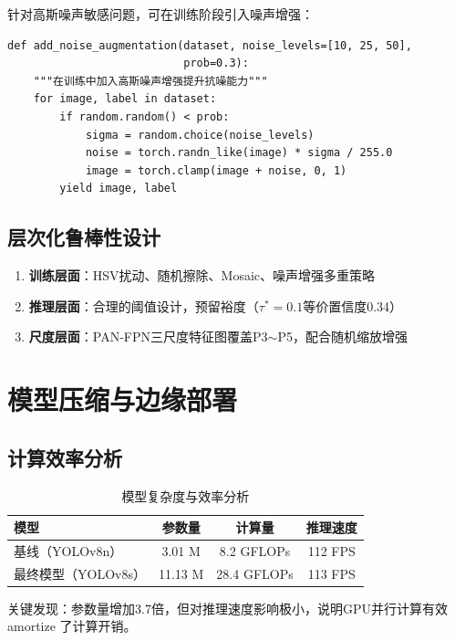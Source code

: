 \documentclass[12pt,a4paper]{ctexart}
\theoremstyle{cumcm}
\begin{document}
针对高斯噪声敏感问题，可在训练阶段引入噪声增强：

\begin{lstlisting}
def add_noise_augmentation(dataset, noise_levels=[10, 25, 50],
                           prob=0.3):
    """在训练中加入高斯噪声增强提升抗噪能力"""
    for image, label in dataset:
        if random.random() < prob:
            sigma = random.choice(noise_levels)
            noise = torch.randn_like(image) * sigma / 255.0
            image = torch.clamp(image + noise, 0, 1)
        yield image, label
\end{lstlisting}

\subsection{层次化鲁棒性设计}

\begin{enumerate}[leftmargin=2.2em,itemsep=2pt]
\item \textbf{训练层面}：HSV扰动、随机擦除、Mosaic、噪声增强多重策略
\item \textbf{推理层面}：合理的阈值设计，预留裕度（$\tau^{*}=0.1$等价置信度0.34）
\item \textbf{尺度层面}：PAN-FPN三尺度特征图覆盖P3$\sim$P5，配合随机缩放增强
\end{enumerate}

\section{模型压缩与边缘部署}

\subsection{计算效率分析}

\begin{table}[H]
\centering
{}
\caption{模型复杂度与效率分析}
\begin{tabular}{lccc}
\toprule
\textbf{模型} & \textbf{参数量} & \textbf{计算量} & \textbf{推理速度} \\
\midrule
基线（YOLOv8n） & 3.01 M & 8.2 GFLOPs & 112 FPS \\
最终模型（YOLOv8s） & 11.13 M & 28.4 GFLOPs & 113 FPS \\
\bottomrule
\end{tabular}
\end{table}

关键发现：参数量增加3.7倍，但对推理速度影响极小，说明GPU并行计算有效 amortize 了计算开销。
\end{document}
